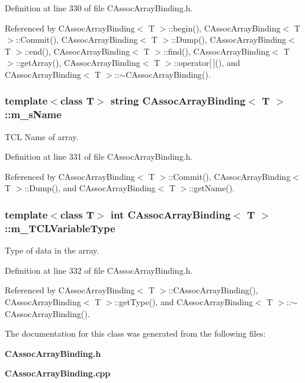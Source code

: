 Definition at line 330 of file CAssoc\-Array\-Binding.h.

Referenced by CAssoc\-Array\-Binding$<$ T $>$::begin(), CAssoc\-Array\-Binding$<$ T $>$::Commit(), CAssoc\-Array\-Binding$<$ T $>$::Dump(), CAssoc\-Array\-Binding$<$ T $>$::end(), CAssoc\-Array\-Binding$<$ T $>$::find(), CAssoc\-Array\-Binding$<$ T $>$::get\-Array(), CAssoc\-Array\-Binding$<$ T $>$::operator[$\,$](), and CAssoc\-Array\-Binding$<$ T $>$::$\sim$CAssoc\-Array\-Binding().
\subsubsection{\setlength{\rightskip}{0pt plus 5cm}template$<$class T$>$ string CAssoc\-Array\-Binding$<$ T $>$::m\_\-s\-Name\hspace{0.3cm}{\tt  [private]}}\label{classCAssocArrayBinding_o1}


TCL Name of array.



Definition at line 331 of file CAssoc\-Array\-Binding.h.

Referenced by CAssoc\-Array\-Binding$<$ T $>$::Commit(), CAssoc\-Array\-Binding$<$ T $>$::Dump(), and CAssoc\-Array\-Binding$<$ T $>$::get\-Name().
\subsubsection{\setlength{\rightskip}{0pt plus 5cm}template$<$class T$>$ int CAssoc\-Array\-Binding$<$ T $>$::m\_\-TCLVariable\-Type\hspace{0.3cm}{\tt  [private]}}\label{classCAssocArrayBinding_o2}


Type of data in the array.



Definition at line 332 of file CAssoc\-Array\-Binding.h.

Referenced by CAssoc\-Array\-Binding$<$ T $>$::CAssoc\-Array\-Binding(), CAssoc\-Array\-Binding$<$ T $>$::get\-Type(), and CAssoc\-Array\-Binding$<$ T $>$::$\sim$CAssoc\-Array\-Binding().

The documentation for this class was generated from the following files:\begin{CompactItemize}
\item 
{\bf CAssoc\-Array\-Binding.h}\item 
{\bf CAssoc\-Array\-Binding.cpp}\end{CompactItemize}
